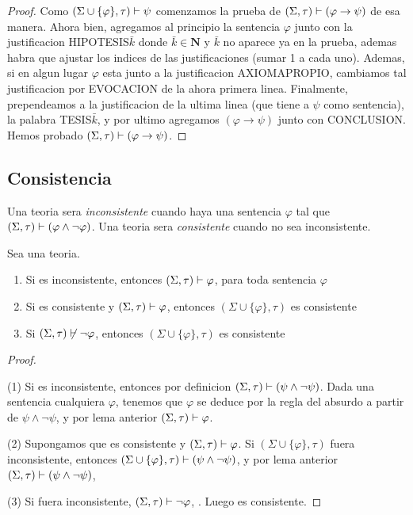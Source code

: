 \begin{proof}
    Como $(\Sigma\cup\{\varphi\},\tau)\vdash\psi$ comenzamos la prueba de $(\Sigma,\tau)\vdash(\varphi\rightarrow\psi)$ de esa manera. Ahora bien,
    agregamos al principio la sentencia $\varphi$ junto con la justificacion HIPOTESIS$\bar{k}$ donde $\bar{k} \in \mathbf{N}$ y $\bar{k}$ no aparece ya en la prueba, ademas
    habra que ajustar los indices de las justificaciones (sumar 1 a cada uno).
    Ademas, si en algun lugar $\varphi$ esta junto a la justificacion AXIOMAPROPIO, cambiamos tal justificacion por EVOCACION de la ahora primera linea.
    Finalmente, prependeamos a la justificacion de la ultima linea (que tiene a $\psi$ como sentencia), la palabra TESIS$\bar{k}$, y por ultimo agregamos 
    $(\varphi\rightarrow\psi)$ junto con CONCLUSION. Hemos probado $(\Sigma,\tau)\vdash(\varphi\rightarrow\psi)$.
  \end{proof}

\subsection{Consistencia}
\begin{definition}
  Una teoria \forder sera \emph{inconsistente} cuando haya una sentencia $\varphi$ tal que $(\Sigma,\tau)\vdash(\varphi\land\neg\varphi)$.
  Una teoria \forder sera \emph{consistente} cuando no sea inconsistente.
\end{definition}

\begin{lemma}
  Sea \forder una teoria. \begin{enumerate}
    \item Si \forder es inconsistente, entonces $(\Sigma,\tau)\vdash\varphi$, para toda sentencia $\varphi$
    \item Si \forder es consistente y $(\Sigma,\tau)\vdash\varphi$, entonces $(\Sigma\cup\{\varphi\},\tau)$ es consistente
    \item Si $(\Sigma,\tau)\not\vdash\neg\varphi$, entonces $(\Sigma\cup\{\varphi\},\tau)$ es consistente
  \end{enumerate}
\end{lemma}
\begin{proof}
  $ $

  (1) Si \forder es inconsistente, entonces por definicion $(\Sigma,\tau)\vdash(\psi\land\neg\psi)$. Dada una sentencia cualquiera 
  $\varphi$, tenemos que $\varphi$ se deduce por la regla del absurdo a partir de $\psi\land\neg\psi$, y por lema anterior $(\Sigma,\tau)\vdash\varphi$.

  (2) Supongamos que \forder es consistente y $(\Sigma,\tau)\vdash\varphi$. Si $(\Sigma\cup\{\varphi\},\tau)$ fuera inconsistente,
  entonces $(\Sigma\cup\{\varphi\},\tau)\vdash(\psi\land\neg\psi)$, y por lema anterior $(\Sigma,\tau)\vdash(\psi\land\neg\psi)$, \abs

  (3) Si \forder fuera inconsistente, $(\Sigma,\tau)\vdash\neg\varphi$, \abs. Luego \forder es consistente.
\end{proof}

